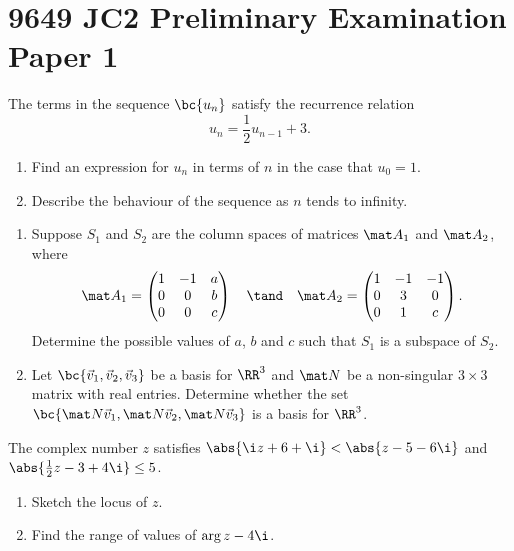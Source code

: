 \section{9649 JC2 Preliminary Examination Paper 1}

\begin{problem}
    The terms in the sequence $\bc{u_n}$ satisfy the recurrence relation \[u_n = \frac12 u_{n-1} + 3.\]

    \begin{enumerate}
        \item Find an expression for $u_n$ in terms of $n$ in the case that $u_0 = 1$.
        \item Describe the behaviour of the sequence as $n$ tends to infinity.
    \end{enumerate}
\end{problem}

\begin{problem}
    \begin{enumerate}
        \item Suppose $S_1$ and $S_2$ are the column spaces of matrices $\mat A_1$ and $\mat A_2$, where \[\mat A_1 = \begin{pmatrix}1 & -1 & a \\ 0 & 0 & b \\ 0 & 0 & c\end{pmatrix} \quad \tand \quad \mat A_2 = \begin{pmatrix}1 & -1 & -1 \\ 0 & 3 & 0 \\ 0 & 1 & c\end{pmatrix}.\] Determine the possible values of $a$, $b$ and $c$ such that $S_1$ is a subspace of $S_2$.
        \item Let $\bc{\vec v_1, \vec v_2, \vec v_3}$ be a basis for $\RR^3$ and $\mat N$ be a non-singular $3 \times 3$ matrix with real entries. Determine whether the set $\bc{\mat N \vec v_1, \mat N \vec v_2, \mat N \vec v_3}$ is a basis for $\RR^3$.
    \end{enumerate}
\end{problem}

\begin{problem}
    The complex number $z$ satisfies $\abs{\i z + 6 + \i} < \abs{z - 5 - 6\i}$ and $\abs{\frac12 z - 3 + 4\i} \leq 5$.

    \begin{enumerate}
        \item Sketch the locus of $z$.
        \item Find the range of values of $\arg{z-4\i}$.
    \end{enumerate}
\end{problem}

